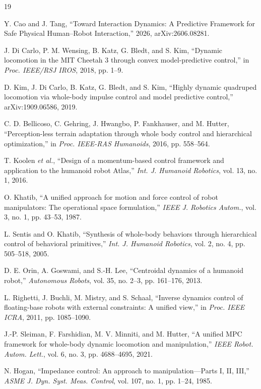 \documentclass[journal]{IEEEtran}
\begin{document}
\begin{thebibliography}{19}

 Y. Cao and J. Tang, ``Toward Interaction Dynamics: A Predictive Framework for Safe Physical Human--Robot Interaction,'' 2026, arXiv:2606.08281.

 J. Di Carlo, P. M. Wensing, B. Katz, G. Bledt, and S. Kim, ``Dynamic locomotion in the MIT Cheetah 3 through convex model-predictive control,'' in \emph{Proc. IEEE/RSJ IROS}, 2018, pp. 1--9.

 D. Kim, J. Di Carlo, B. Katz, G. Bledt, and S. Kim, ``Highly dynamic quadruped locomotion via whole-body impulse control and model predictive control,'' arXiv:1909.06586, 2019.

 C. D. Bellicoso, C. Gehring, J. Hwangbo, P. Fankhauser, and M. Hutter, ``Perception-less terrain adaptation through whole body control and hierarchical optimization,'' in \emph{Proc. IEEE-RAS Humanoids}, 2016, pp. 558--564.

 T. Koolen \emph{et al.}, ``Design of a momentum-based control framework and application to the humanoid robot Atlas,'' \emph{Int. J. Humanoid Robotics}, vol. 13, no. 1, 2016.

 O. Khatib, ``A unified approach for motion and force control of robot manipulators: The operational space formulation,'' \emph{IEEE J. Robotics Autom.}, vol. 3, no. 1, pp. 43--53, 1987.

 L. Sentis and O. Khatib, ``Synthesis of whole-body behaviors through hierarchical control of behavioral primitives,'' \emph{Int. J. Humanoid Robotics}, vol. 2, no. 4, pp. 505--518, 2005.

 D. E. Orin, A. Goswami, and S.-H. Lee, ``Centroidal dynamics of a humanoid robot,'' \emph{Autonomous Robots}, vol. 35, no. 2--3, pp. 161--176, 2013.

 L. Righetti, J. Buchli, M. Mistry, and S. Schaal, ``Inverse dynamics control of floating-base robots with external constraints: A unified view,'' in \emph{Proc. IEEE ICRA}, 2011, pp. 1085--1090.

 J.-P. Sleiman, F. Farshidian, M. V. Minniti, and M. Hutter, ``A unified MPC framework for whole-body dynamic locomotion and manipulation,'' \emph{IEEE Robot. Autom. Lett.}, vol. 6, no. 3, pp. 4688--4695, 2021.

 N. Hogan, ``Impedance control: An approach to manipulation---Parts I, II, III,'' \emph{ASME J. Dyn. Syst. Meas. Control}, vol. 107, no. 1, pp. 1--24, 1985.


\end{thebibliography}
\end{document}
